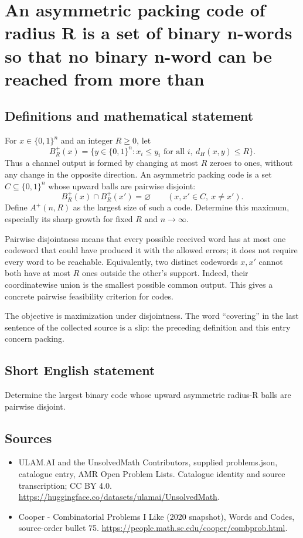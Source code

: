 \documentclass[11pt,a4paper]{article}
\begin{document}
\section*{An asymmetric packing code of radius R is a set of binary n-words so that no binary n-word can be reached from more than}\label{statement}

\subsection{Definitions and mathematical statement}
For $x\in\{0,1\}^n$ and an integer $R\ge0$, let
\[
 B_R^+(x)=\{y\in\{0,1\}^n:x_i\le y_i\text{ for all }i,
                              \ d_H(x,y)\le R\}.
\]
Thus a channel output is formed by changing at most $R$ zeroes
to ones, without any change in the opposite direction.
An asymmetric packing code is a set $C\subseteq\{0,1\}^n$ whose
upward balls are pairwise disjoint:
\[
             B_R^+(x)\cap B_R^+(x')=\varnothing
                       \qquad(x,x'\in C,\ x\ne x').
\]
Define $A^+(n,R)$ as the largest size of such a code.
Determine this maximum, especially its sharp growth for fixed
$R$ and $n\to\infty$.

Pairwise disjointness means that every possible received word
has at most one codeword that could have produced it with the
allowed errors; it does not require every word to be reachable.
Equivalently, two distinct codewords $x,x'$ cannot both have at
most $R$ ones outside the other's support. Indeed, their
coordinatewise union is the smallest possible common output.
This gives a concrete pairwise feasibility criterion for codes.

The objective is maximization under disjointness. The word
``covering'' in the last sentence of the collected source is a
slip: the preceding definition and this entry concern packing.
\subsection{Short English statement}
Determine the largest binary code whose upward asymmetric radius-R balls are pairwise disjoint.
\subsection{Sources}
\begin{itemize}
\item[S1] ULAM.AI and the UnsolvedMath Contributors, supplied problems.json, catalogue entry, AMR Open Problem Lists. Catalogue identity and source transcription; CC BY 4.0.
\url{https://huggingface.co/datasets/ulamai/UnsolvedMath}.
\item[S2] Cooper - Combinatorial Problems I Like (2020 snapshot), Words and Codes, source-order bullet 75. 
\url{https://people.math.sc.edu/cooper/combprob.html}.
\end{itemize}
\end{document}
